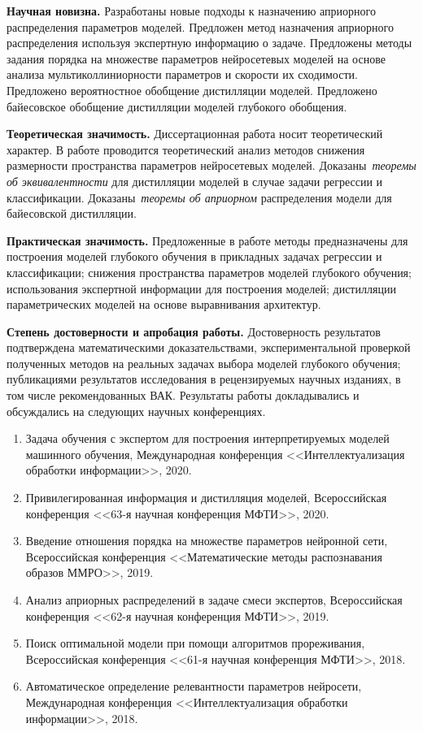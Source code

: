 \documentclass{dissert}
\begin{document}
\vspace{0.5cm}
\textbf{Научная новизна.} Разработаны новые подходы к назначению априорного распределения параметров моделей. Предложен метод назначения априорного распределения используя экспертную информацию о задаче. Предложены методы задания порядка на множестве параметров нейросетевых моделей на основе анализа мультиколлиниорности параметров и скорости их сходимости. Предложено вероятностное обобщение дистилляции моделей. Предложено байесовское обобщение дистилляции моделей глубокого обобщения.

\vspace{0.5cm}
\textbf{Теоретическая значимость.} Диссертационная работа носит теоретический характер. В работе проводится теоретический анализ методов снижения размерности пространства параметров нейросетевых моделей. Доказаны~\emph{теоремы об эквивалентности} для дистилляции моделей в случае задачи регрессии и классификации. Доказаны~\emph{теоремы об априорном} распределения модели для байесовской дистилляции.

\vspace{0.5cm}
\textbf{Практическая значимость.} Предложенные в работе методы предназначены для построения моделей глубокого обучения в прикладных задачах регрессии и классификации; снижения пространства параметров моделей глубокого обучения; использования экспертной информации для построения моделей; дистилляции параметрических моделей на основе выравнивания архитектур.

\vspace{0.5cm}
\textbf{Степень достоверности и апробация работы.} Достоверность результатов подтверждена математическими доказательствами, экспериментальной проверкой полученных методов на реальных задачах выбора моделей глубокого обучения; публикациями результатов исследования в рецензируемых научных изданиях, в том числе рекомендованных ВАК. Результаты работы докладывались и обсуждались на следующих научных конференциях.
\begin{enumerate}
    \item Задача обучения с экспертом для построения интерпретируемых моделей машинного обучения, Международная конференция <<Интеллектуализация обработки информации>>, 2020.
    \item Привилегированная информация и дистилляция моделей, Всероссийская конференция <<63-я научная конференция МФТИ>>, 2020.
    \item Введение отношения порядка на множестве параметров нейронной сети, Всероссийская конференция <<Математические методы распознавания образов ММРО>>, 2019.
    \item Анализ априорных распределений в задаче смеси экспертов, Всероссийская конференция <<62-я научная конференция МФТИ>>, 2019.
    \item Поиск оптимальной модели при помощи алгоритмов прореживания, Всероссийская конференция <<61-я научная конференция МФТИ>>, 2018.
    \item Автоматическое определение релевантности параметров нейросети, Международная конференция <<Интеллектуализация обработки информации>>, 2018.
\end{enumerate}
\end{document}
